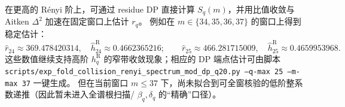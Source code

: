 \begin{remark}[更高阶 DP 端点指纹（\(q=24,25\)）]\label{rem:pom-renyi-endpoint-q24-25}
在更高的 Rényi 阶上，可通过 residue DP 直接计算 \(S_q(m)\)，并用比值收敛与 Aitken \(\Delta^2\) 加速在固定窗口上估计 \(r_q\)。
例如在 \(m\in\{34,35,36,37\}\) 的窗口上得到稳定估计：
\[
\widehat r_{24}\approx 369.478420314,\quad \widehat h_{24}^{\mathrm R}\approx 0.4662365216;\qquad
\widehat r_{25}\approx 466.281715009,\quad \widehat h_{25}^{\mathrm R}\approx 0.4659953968.
\]
这些数值继续支持高阶 \(h_q^{\mathrm R}\) 的窄带收敛现象；相应的 DP 端点估计可由脚本
\texttt{scripts/exp\_fold\_collision\_renyi\_spectrum\_mod\_dp\_q20.py --q-max 25 --m-max 37}
一键生成。
但在当前窗口 \(m\le 37\) 下，尚未拟合到可全窗核验的低阶整系数递推（因此暂未进入全谱根扫描/ \(\beta_q,\delta_q\) 的“精确”口径）。
\end{remark}
